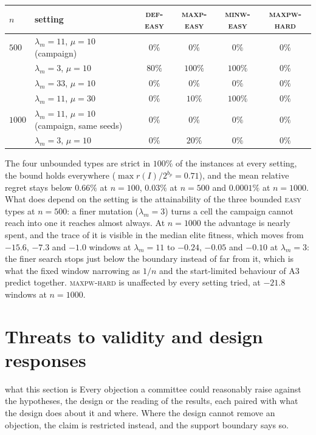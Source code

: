 \documentclass[a4paper,11pt]{article}
\newcommand{\bp}{b_{p}}
\newcommand{\DEF}{\textsc{def}}
\newcommand{\MAXP}{\textsc{maxp}}
\newcommand{\MAXPW}{\textsc{maxpw}}
\newcommand{\MINW}{\textsc{minw}}
\theoremstyle{plain}
\theoremstyle{definition}
\theoremstyle{remark}
\begin{document}
\begin{center}\small
\begin{tabular}{@{}llcccc@{}}
\toprule
$n$ & setting & \DEF-\textsc{easy} & \MAXP-\textsc{easy} & \MINW-\textsc{easy} & \MAXPW-\textsc{hard} \\
\midrule
$500$ & $\lambda_m=11$, $\mu=10$ (campaign) & $0\%$ & $0\%$ & $0\%$ & $0\%$ \\
& $\lambda_m=3$, $\mu=10$ & $80\%$ & $100\%$ & $100\%$ & $0\%$ \\
& $\lambda_m=33$, $\mu=10$ & $0\%$ & $0\%$ & $0\%$ & $0\%$ \\
& $\lambda_m=11$, $\mu=30$ & $0\%$ & $10\%$ & $100\%$ & $0\%$ \\
\addlinespace[2pt]
$1000$ & $\lambda_m=11$, $\mu=10$ (campaign, same seeds) & $0\%$ & $0\%$ & $0\%$ & $0\%$ \\
& $\lambda_m=3$, $\mu=10$ & $0\%$ & $20\%$ & $0\%$ & $0\%$ \\
\bottomrule
\end{tabular}
\end{center}

The four unbounded types are strict in $100\%$ of the instances at every setting, the bound
holds everywhere ($\max r(I)/2^{\bp}=0.71$), and the mean relative regret stays below
$0.66\%$ at $n=100$, $0.03\%$ at $n=500$ and $0.0001\%$ at $n=1000$. What does depend on the
setting is the attainability of the three bounded \textsc{easy} types at $n=500$: a finer
mutation ($\lambda_m=3$) turns a cell the campaign cannot reach into one it reaches almost
always. At $n=1000$ the advantage is nearly spent, and the trace of it is visible in the
median elite fitness, which moves from $-15.6$, $-7.3$ and $-1.0$ windows at $\lambda_m=11$
to $-0.24$, $-0.05$ and $-0.10$ at $\lambda_m=3$: the finer search stops just below the
boundary instead of far from it, which is what the fixed window narrowing as $1/n$ and the
start-limited behaviour of A3 predict together. \MAXPW-\textsc{hard} is unaffected by every
setting tried, at $-21.8$ windows at $n=1000$.

\section{Threats to validity and design responses}\label{sec:threats}

\begin{plain}{what this section is}
Every objection a committee could reasonably raise against the hypotheses, the design or the
reading of the results, each paired with what the design does about it and where. Where the
design cannot remove an objection, the claim is restricted instead, and the support boundary
says so.
\end{plain}
\end{document}
